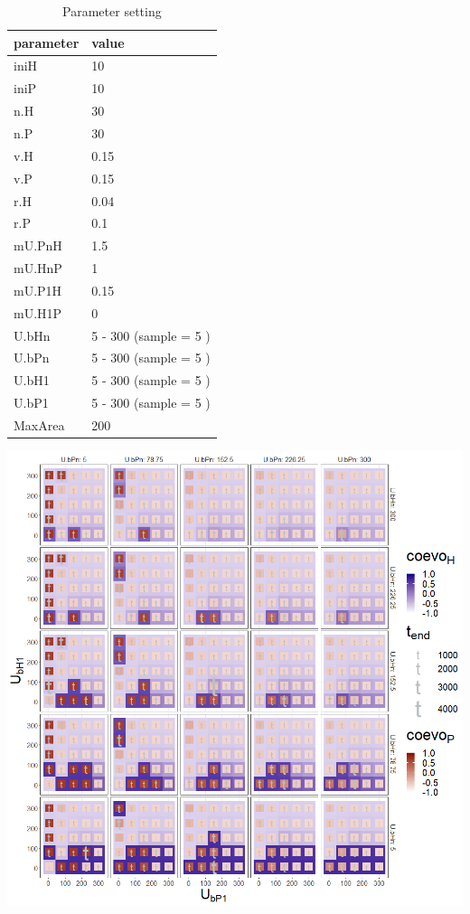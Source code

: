 \documentclass[
]{book}
\begin{document}
\begin{table}[!h]

\caption{\label{tab:4UbHUbPtablepdf}Parameter setting}
\centering
\begin{tabular}[t]{l|l}
\hline
parameter & value\\
\hline
iniH & 10\\
\hline
iniP & 10\\
\hline
n.H & 30\\
\hline
n.P & 30\\
\hline
v.H & 0.15\\
\hline
v.P & 0.15\\
\hline
r.H & 0.04\\
\hline
r.P & 0.1\\
\hline
mU.PnH & 1.5\\
\hline
mU.HnP & 1\\
\hline
mU.P1H & 0.15\\
\hline
mU.H1P & 0\\
\hline
U.bHn & 5 - 300 (sample = 5 )\\
\hline
U.bPn & 5 - 300 (sample = 5 )\\
\hline
U.bH1 & 5 - 300 (sample = 5 )\\
\hline
U.bP1 & 5 - 300 (sample = 5 )\\
\hline
MaxArea & 200\\
\hline
\end{tabular}
\end{table}

\newpage

\includegraphics[width=1\linewidth]{plots/4_fourPar-U.bH-U.bP_plot}
\end{document}
